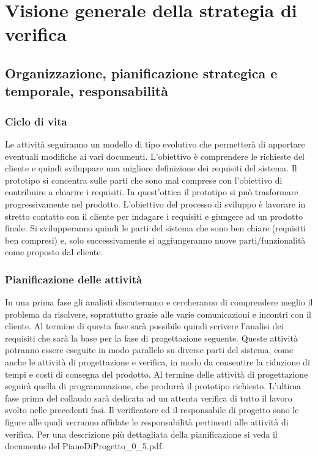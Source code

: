\documentclass[11pt,titlepage,a4paper]{report}
\begin{document}
\chapter[Strategia di verifica]{Visione generale della strategia di verifica}

\section[Organizzazione, pianificazione, responsabilit\`a]{Organizzazione, pianificazione strategica e temporale, responsabilit\`a}
\subsection{Ciclo di vita}
Le attivit\`a seguiranno un modello di tipo evolutivo che permetter\`a di apportare eventuali modifiche ai vari documenti. L'obiettivo \`e comprendere le richieste del cliente e quindi sviluppare una migliore definizione dei requisiti del sistema. Il prototipo si concentra sulle parti che sono mal comprese con l'obiettivo di contribuire a chiarire i requisiti. In quest'ottica il prototipo si pu\`o trasformare progressivamente nel prodotto. L'obiettivo del processo di sviluppo \`e lavorare in stretto contatto con il cliente per indagare i requisiti e giungere ad un prodotto finale. Si svilupperanno quindi le parti del sistema che sono ben chiare (requisiti ben compresi) e, solo successivamente si aggiungeranno nuove parti/funzionalit\`a come proposto dal cliente. 
\subsection{Pianificazione delle attivit\`a}
In una prima fase gli analisti discuteranno e cercheranno di comprendere meglio il problema da risolvere, soprattutto grazie alle varie comunicazioni e incontri con il cliente. Al termine di questa fase sar\`a possibile quindi scrivere l'analisi dei requisiti che sar\`a la base per la fase di progettazione seguente. Queste attivit\`a potranno essere eseguite in modo parallelo su diverse parti del sistema, come anche le attivit\`a di progettazione e verifica, in modo da consentire la riduzione di tempi e costi di consegna del prodotto. Al termine delle attivit\`a di progettazione seguir\`a quella di programmazione, che produrr\`a il prototipo richiesto. L'ultima fase prima del collaudo sar\`a dedicata ad un attenta verifica di tutto il lavoro svolto nelle precedenti fasi. Il verificatore ed il responsabile di progetto sono le figure alle quali verranno affidate le responsabilit\`a pertinenti alle attivit\`a di verifica. Per una descrizione pi\`u dettagliata della pianificazione si veda il documento del PianoDiProgetto\_0\_5.pdf.
\end{document}
